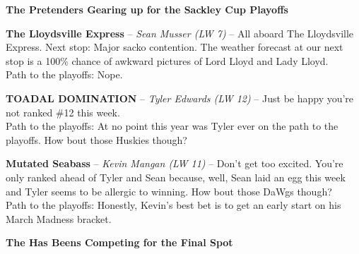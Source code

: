 \documentclass[11pt,letterpaper]{article}
\begin{document}
\newpage
{}
\textbf{\large{The Pretenders Gearing up for the Sackley Cup Playoffs}}
\begin{etaremune}
\setcounter{enumi}{13}
\item \textbf{The Lloydsville Express} -- \textit{Sean Musser (LW 7)} -- All aboard The Lloydsville Express. Next stop: Major sacko contention. The weather forecast at our next stop is a 100\% chance of awkward pictures of Lord Lloyd and Lady Lloyd.
\medskip\\Path to the playoffs: Nope. 
\item \textbf{TOADAL DOMINATION} -- \textit{Tyler Edwards (LW 12)} -- Just be happy you're not ranked \#12 this week.
\medskip\\Path to the playoffs: At no point this year was Tyler ever on the path to the playoffs. How bout those Huskies though?
\item \textbf{Mutated Seabass} -- \textit{Kevin Mangan (LW 11)} -- Don't get too excited. You're only ranked ahead of Tyler and Sean because, well, Sean laid an egg this week and Tyler seems to be allergic to winning. How bout those DaWgs though?
\medskip\\Path to the playoffs: Honestly, Kevin's best bet is to get an early start on his March Madness bracket.
\end{etaremune}
\textbf{\large{The Has Beens Competing for the Final Spot}}
\end{document}
